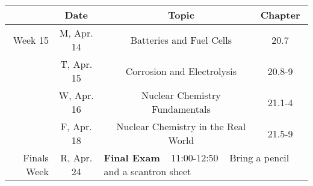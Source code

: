 \documentclass[12pt, letterpaper]{article}
\begin{document}
\begin{tabular}{rcccc}
& Date && Topic & Chapter\\
\midrule
Week 15 & M, Apr. 14&& Batteries and Fuel Cells & 20.7\\
& T, Apr. 15&& Corrosion and Electrolysis & 20.8-9\\
& W, Apr. 16&& Nuclear Chemistry Fundamentals & 21.1-4\\
& F, Apr. 18&& Nuclear Chemistry in the Real World & 21.5-9\\
\midrule
\midrule
Finals Week & R, Apr. 24 & \multicolumn{3}{l}{\textbf{Final Exam} ~ 11:00-12:50 ~ Bring a pencil and a scantron sheet}\\
\end{tabular}
\end{document}
